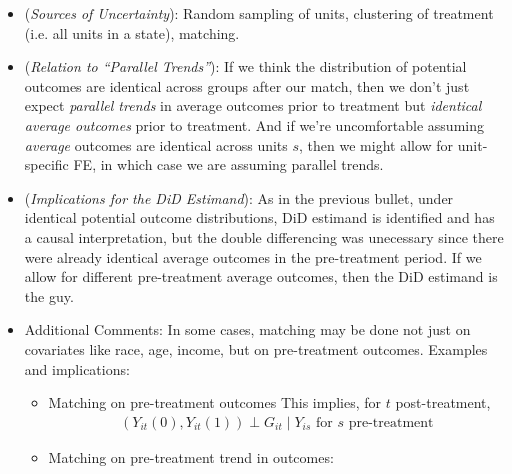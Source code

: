 \documentclass[12pt]{article}
\theoremstyle{plain}
\theoremstyle{definition}
\theoremstyle{remark}
\begin{document}
\begin{itemize}
  \item
    (\emph{Sources of Uncertainty}):
    Random sampling of units, clustering of treatment (i.e. all units in
    a state), matching.

  \item
    (\emph{Relation to ``Parallel Trends''}):
    If we think the distribution of potential outcomes are identical
    across groups after our match, then we don't just expect
    \emph{parallel trends} in average outcomes prior to treatment
    but \emph{identical average outcomes} prior to treatment.
    And if we're uncomfortable assuming \emph{average} outcomes are
    identical across units $s$, then we might allow for unit-specific
    FE, in which case we are assuming parallel trends.

  \item
    (\emph{Implications for the DiD Estimand}):
    As in the previous bullet, under identical potential outcome
    distributions, DiD estimand is identified and has a causal
    interpretation, but the double differencing was unecessary since
    there were already identical average outcomes in the pre-treatment
    period.
    If we allow for different pre-treatment average outcomes, then the
    DiD estimand is the guy.

  \item
    Additional Comments:
    In some cases, matching may be done not just on covariates like
    race, age, income, but on pre-treatment outcomes.
    Examples and implications:
    \begin{itemize}
      \item Matching on pre-treatment outcomes
        This implies, for $t$ post-treatment,
        \begin{align*}
          (Y_{it}(0),Y_{it}(1))
          \perp
          G_{it}
          \;
          |
          \;
          \text{$Y_{is}$ for $s$ pre-treatment}
        \end{align*}


      \item Matching on pre-treatment trend in outcomes:
    \end{itemize}
\end{itemize}


\begin{comment}
- Changes in Changes
  - Model: Implicity common model btw grps,
- Random Assignment
  - Model: None neede
  - Assignment Mech: Random
  - Identified Causal Params
    - Ave outcomes under T or C for each period after treatment, hence ATEs
    - Average trends under T or C, hence ATEs for the trends
  - Est of Causal Param: Simple diffs in means between T & C
  - Sources of uncertainty: Assignment, sampling
  - Parallel trends: No assumption of this at all. For the treatment group, the counterfactual trend in outcomes *for those units* is completely missing/unidentified, and we make no parametric assumptions to extrapolate. The only thing identified is the average trends under T or C
  - DiD estimand one of many. Randomization lets us est straight diff in levels
- Assignment Correlated with Initial Level
- Assignment Correlated with Initial Trend
- Assignment Depends on Passing Threshold
\end{comment}
\end{document}
